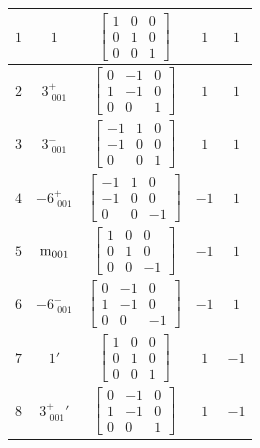 \documentclass[fleqn,8pt]{jsarticle}
\begin{document}
\begin{longtable}{ccccc}
$ 1 $ & $ 1 $ & $ \begin{bmatrix} 1 & 0 & 0 \\ 0 & 1 & 0 \\ 0 & 0 & 1 \end{bmatrix} $ & $ 1 $ & $ 1 $ \\ \hline
$ 2 $ & $ 3^{+}_{\,\,001} $ & $ \begin{bmatrix} 0 & -1 & 0 \\ 1 & -1 & 0 \\ 0 & 0 & 1 \end{bmatrix} $ & $ 1 $ & $ 1 $ \\ \hline
$ 3 $ & $ 3^{-}_{\,\,001} $ & $ \begin{bmatrix} -1 & 1 & 0 \\ -1 & 0 & 0 \\ 0 & 0 & 1 \end{bmatrix} $ & $ 1 $ & $ 1 $ \\ \hline
$ 4 $ & $ -6^{+}_{\,\,001} $ & $ \begin{bmatrix} -1 & 1 & 0 \\ -1 & 0 & 0 \\ 0 & 0 & -1 \end{bmatrix} $ & $ -1 $ & $ 1 $ \\ \hline
$ 5 $ & $ {\rm m}_{001} $ & $ \begin{bmatrix} 1 & 0 & 0 \\ 0 & 1 & 0 \\ 0 & 0 & -1 \end{bmatrix} $ & $ -1 $ & $ 1 $ \\ \hline
$ 6 $ & $ -6^{-}_{\,\,001} $ & $ \begin{bmatrix} 0 & -1 & 0 \\ 1 & -1 & 0 \\ 0 & 0 & -1 \end{bmatrix} $ & $ -1 $ & $ 1 $ \\ \hline
$ 7 $ & $ 1{}' $ & $ \begin{bmatrix} 1 & 0 & 0 \\ 0 & 1 & 0 \\ 0 & 0 & 1 \end{bmatrix} $ & $ 1 $ & $ -1 $ \\ \hline
$ 8 $ & $ 3^{+}_{\,\,001}{}' $ & $ \begin{bmatrix} 0 & -1 & 0 \\ 1 & -1 & 0 \\ 0 & 0 & 1 \end{bmatrix} $ & $ 1 $ & $ -1 $ \\ \hline

\end{longtable}
\end{document}
